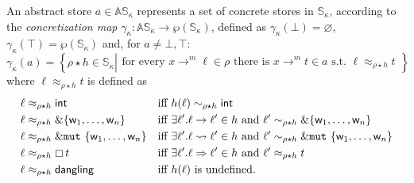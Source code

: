 \begin{definition}\label{def:concretization}
  An abstract store $a\in\mathbb{AS}_\kappa$ represents a set of concrete stores
  in $\mathbb{S}_\kappa$, according to the \emph{concretization map}
  $\gamma_\kappa:\mathbb{AS}_\kappa\to\wp(\mathbb{S}_\kappa)$, defined as
  $\gamma_\kappa(\bot)=\varnothing$, $\gamma_\kappa(\top)=\wp(\mathbb{S}_\kappa)$ and,
  for $a\not=\bot,\top$:
  \[
  \gamma_\kappa(a)=\left\{\rho\star h\in\mathbb{S}_\kappa\left|\begin{array}{l}
  \text{for every }x\to^m\ell\in\rho\text{ there is }x\to^m t\in a\text{ s.t.\ }\ell\approx_{\rho\star h}t
  \end{array}
  \right.\right\}
  \]
  where $\ell\approx_{\rho\star h}t$ is defined as
  \begin{align*}
    \ell&\approx_{\rho\star h}\mathsf{int} && \text{iff $h(\ell)\sim_{\rho\star h}\mathsf{int}$}\\
    \ell&\approx_{\rho\star h}\&\{\mathsf{w}_1,\ldots,\mathsf{w}_n\} && \text{iff $\exists\ell'.\ell\to\ell'\in h$ and $\ell'\sim_{\rho\star h}\&\{\mathsf{w}_1,\ldots,\mathsf{w}_n\}$}\\
    \ell&\approx_{\rho\star h}\&\mathtt{mut}\ \{\mathsf{w}_1,\ldots,\mathsf{w}_n\} && \text{iff $\exists\ell'.\ell\leadsto\ell'\in h$ and $\ell'\sim_{\rho\star h}\&\mathtt{mut}\ \{\mathsf{w}_1,\ldots,\mathsf{w}_n\}$}\\
    \ell&\approx_{\rho\star h}\boxempty\,{t} && \text{iff $\exists\ell'.\ell\Rightarrow\ell'\in h$ and $\ell'\approx_{\rho\star h}t$}\\
    \ell&\approx_{\rho\star h}\mathsf{dangling} && \text{iff $h(\ell)$ is undefined.}
  \end{align*}
\end{definition}


